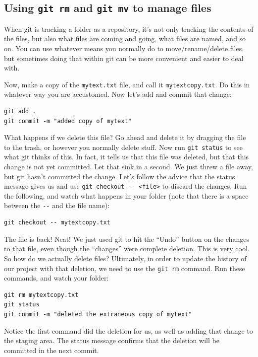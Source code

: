 \documentclass{article}
\begin{document}
\subsection{Using \texttt{git rm} and \texttt{git mv} to manage files}
\label{sec-5-4}

When git is tracking a folder as a repository, it's not only tracking the contents of the files, but also what files are coming and going, what files are named, and so on. You can use whatever means you normally do to move/rename/delete files, but sometimes doing that within git can be more convenient and easier to deal with.

Now, make a copy of the \texttt{mytext.txt} file, and call it \texttt{mytextcopy.txt}.  Do this in whatever way you are accustomed.  Now let's add and commit that change:


\begin{verbatim}
git add .
git commit -m "added copy of mytext"
\end{verbatim}

What happens if we delete this file?  Go ahead and delete it by dragging the file to the trash, or however you normally delete stuff.  Now run \texttt{git status} to see what git thinks of this.  In fact, it tells us that this file was deleted, but that this change is not yet committed.  Let that sink in a second.  We just threw a file away, but git hasn't committed the change.  Let's follow the advice that the status message gives us and use \texttt{git checkout -{}- <file>} to discard the changes.  Run the following, and watch what happens in your folder (note that there is a space between the \texttt{-{}-} and the file name):


\begin{verbatim}
git checkout -- mytextcopy.txt
\end{verbatim}

The file is back! Neat! We just used git to hit the ``Undo'' button on the changes to that file, even though the ``changes'' were complete deletion. This is very cool. So how do we actually delete files?  Ultimately, in order to update the history of our project with that deletion, we need to use the \texttt{git rm} command. Run these commands, and watch your folder:


\begin{verbatim}
git rm mytextcopy.txt
git status
git commit -m "deleted the extraneous copy of mytext"
\end{verbatim}

Notice the first command did the deletion for us, as well as adding that change to the staging area. The status message confirms that the deletion will be committed in the next commit.
\end{document}
